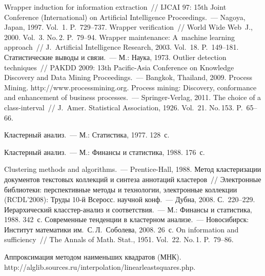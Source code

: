 \begin{multicols}{2}
{{\begin{thebibliography}{99}
 Wrapper induction for 
information extraction~//  IJCAI 97: 15th Joint Conference (International)  on 
Artificial Intelligence Proceedings.~--- Nagoya, Japan, 1997. Vol.~1. P.~729--737.
 Wrapper verification~// World Wide Web~J., 2000. Vol.~3. 
No.\,2. P.~79--94.
 Wrapper maintenance: A~machine learning 
approach~// J.~Artificial Intelligence Research, 2003. Vol.~18. P.~149--181.
 Статистические выводы и связи.~--- М.: Наука, 
1973.
 Outlier detection 
techniques~// PAKDD 2009: 13th Pacific-Asia Conference on Knowledge Discovery 
and Data Mining Proceedings.~--- Bangkok, Thailand, 2009.
Process Mining. {\sf http://www.processmining.org}.
 Process mining: Discovery, conformance and 
enhancement of business processes.~--- Springer-Verlag, 2011.
 The choice of a class-interval~// J.~Amer. Statistical Association, 
1926. Vol.~21. No.\,153. P.~65--66.

 Кластерный анализ.~--- М.: Статистика, 1977. 128~с. 

 Кластерный анализ.~--- М.: Финансы и статистика, 1988. 
176~с.

 Clustering methods and algorithms.~--- Prentice-Hall, 1988.
 Метод 
кластеризации документов текстовых коллекций и синтеза аннотаций кластеров~// 
Электронные библиотеки: перспективные методы и технологии, электронные 
коллекции (RCDL'2008): Труды 10-й Всеросс. научной конф.~--- Дубна, 2008. 
С.~220--229.
 Иерархический класс\-тер-ана\-лиз и соответствия.~--- М.: 
Финансы и статистика, 1988. 342~с. 
 Современные тенденции в кластерном 
анализе.~--- Новосибирск: Институт математики им.\ С.\,Л.~Соболева, 2008. 
26~с.
 On information and sufficiency~// The Annals of 
Math. Stat., 1951. Vol.~22. No.\,1. P.~79--86.

\label{end\stat}

Аппроксимация методом наименьших квадратов (МНК). {\sf 
http://alglib.sources.ru/interpolation/\linebreak linearleastsquares.php}.

\end{thebibliography} } }

\end{multicols}

  